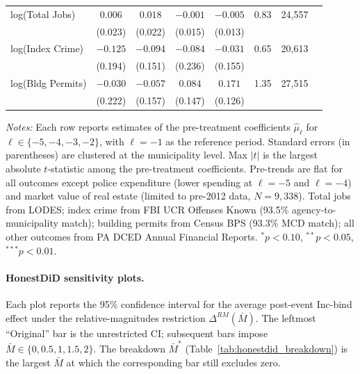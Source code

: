 \documentclass[12pt]{article}
\begin{document}
\begin{table}[H]
\begin{tabular}{lccccccc}
        log(Total Jobs)    & $0.006$  & $0.018$  & $-0.001$ & $-0.005$ & 0.83 & 24{,}557 \\
                           & (0.023)  & (0.022)  & (0.015)  & (0.013)  &      &          \\[0.3em]
        log(Index Crime)   & $-0.125$ & $-0.094$ & $-0.084$ & $-0.031$ & 0.65 & 20{,}613 \\
                           & (0.194)  & (0.151)  & (0.236)  & (0.155)  &      &          \\[0.3em]
        log(Bldg Permits)  & $-0.030$ & $-0.057$ & $0.084$  & $0.171$  & 1.35 & 27{,}515 \\
                           & (0.222)  & (0.157)  & (0.147)  & (0.126)  &      &          \\
        \bottomrule
    \end{tabular}
    \vspace{0.3em}
    \begin{minipage}{0.92\textwidth}
        \footnotesize \textit{Notes:} Each row reports \citet{sunab2021}
        estimates of the pre-treatment coefficients $\hat{\mu}_\ell$ for
        $\ell \in \{-5, -4, -3, -2\}$, with $\ell = -1$ as the reference
        period. Standard errors (in parentheses) are clustered at the
        municipality level. Max $|t|$ is the largest absolute $t$-statistic
        among the pre-treatment coefficients. Pre-trends are flat for
        all outcomes except police expenditure (lower spending at $\ell = -5$
        and $\ell = -4$) and market value of real estate (limited to pre-2012
        data, $N = 9{,}338$). Total jobs from LODES; index crime from FBI UCR
        Offenses Known (93.5\% agency-to-municipality match); building permits
        from Census BPS (93.3\% MCD match); all other outcomes from PA DCED
        Annual Financial Reports.
        $^{*}p<0.10$, $^{**}p<0.05$, $^{***}p<0.01$.
    \end{minipage}
\end{table}

\paragraph{HonestDiD sensitivity plots.}
Each plot reports the 95\% confidence interval for the average
post-event Inc-bind effect under the
\citet{rambachanMoreCredibleApproach2023} relative-magnitudes
restriction $\Delta^{RM}(\bar{M})$. The leftmost ``Original'' bar is
the unrestricted CI; subsequent bars impose $\bar{M} \in
\{0, 0.5, 1, 1.5, 2\}$. The breakdown $\bar{M}^{*}$
(Table~\ref{tab:honestdid_breakdown}) is the largest $\bar{M}$ at
which the corresponding bar still excludes zero.
\end{document}
